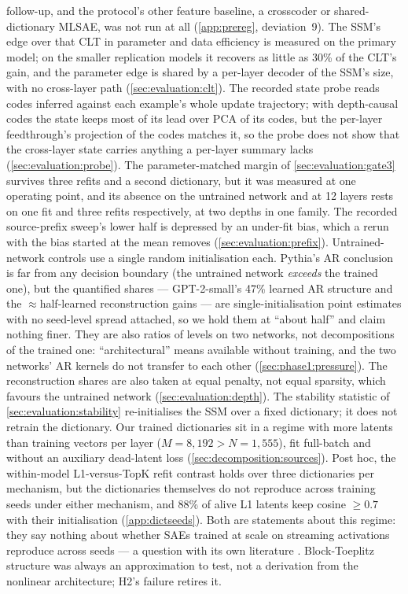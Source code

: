 follow-up, and the protocol's other feature baseline, a crosscoder or
shared-dictionary MLSAE, was not run at all (\cref{app:prereg},
deviation~9). The SSM's edge over that CLT in parameter and data efficiency
is measured on the primary model; on the smaller replication models it
recovers as little as 30\% of the CLT's gain, and the parameter edge is
shared by a per-layer decoder of the SSM's size, with no cross-layer path
(\cref{sec:evaluation:clt}).
The recorded state probe reads codes inferred against each example's whole
update trajectory; with depth-causal codes the state keeps most of its lead
over PCA of its codes, but the per-layer feedthrough's projection of the codes
matches it, so the probe does not show that the cross-layer state carries
anything a per-layer summary lacks (\cref{sec:evaluation:probe}). The
parameter-matched margin of \cref{sec:evaluation:gate3} survives three refits
and a second dictionary, but it was measured at one operating point, and its
absence on the untrained network and at 12 layers rests on one fit and three
refits respectively, at two depths in one family.
The recorded source-prefix sweep's lower half is depressed by an under-fit
bias, which a rerun with the bias started at the mean removes
(\cref{sec:evaluation:prefix}). Untrained-network controls use a single
random initialisation each.
Pythia's AR conclusion is far from any decision boundary (the untrained
network \emph{exceeds} the trained one), but the quantified shares ---
GPT-2-small's 47\% learned AR structure and the ${\approx}$half-learned
reconstruction gains --- are single-initialisation point estimates with no
seed-level spread attached, so we hold them at ``about half'' and claim
nothing finer. They are also ratios of levels on two networks, not
decompositions of the trained one: ``architectural'' means available without
training, and the two networks' AR kernels do not transfer to each other
(\cref{sec:phase1:pressure}). The reconstruction shares are also taken at equal penalty, not
equal sparsity, which favours the untrained network
(\cref{sec:evaluation:depth}). The stability statistic of \cref{sec:evaluation:stability}
re-initialises the SSM over a fixed dictionary; it does not retrain the
dictionary. Our trained dictionaries sit in a regime with more latents than
training vectors per layer ($M = 8{,}192 > N = 1{,}555$), fit full-batch and
without an auxiliary dead-latent loss (\cref{sec:decomposition:sources}).
Post hoc, the within-model L1-versus-TopK refit contrast holds over three
dictionaries per mechanism, but the dictionaries themselves do not
reproduce across training seeds under either mechanism, and 88\% of alive
L1 latents keep cosine $\ge 0.7$ with their initialisation
(\cref{app:dictseeds}). Both are
statements about this regime: they say nothing about whether SAEs trained
at scale on streaming activations reproduce across seeds --- a question
with its own literature \citep{paulo2026seeds,song2026consistency}. Block-Toeplitz structure was always an approximation to test,
not a derivation from the nonlinear architecture; H2's failure retires it.

